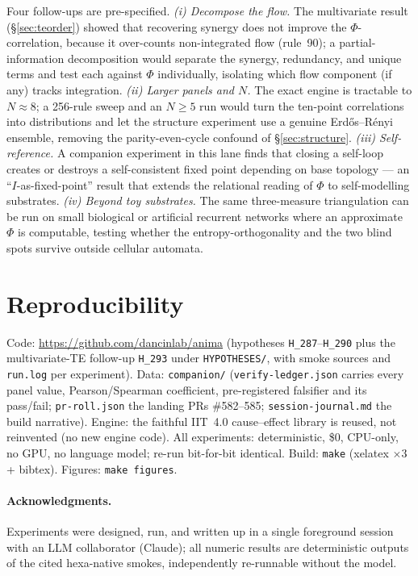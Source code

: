 \documentclass[11pt,a4paper]{article}
\newcommand{\bigphi}{\ensuremath{\Phi}}
\begin{document}
Four follow-ups are pre-specified. \emph{(i) Decompose the flow.} The
multivariate result (\S\ref{sec:teorder}) showed that recovering synergy
does not improve the \bigphi{}-correlation, because it over-counts
non-integrated flow (rule~90); a partial-information decomposition would
separate the synergy, redundancy, and unique terms and test each against
\bigphi{} individually, isolating which flow component (if any) tracks
integration. \emph{(ii) Larger panels and \(N\).} The exact engine is tractable
to \(N\!\approx\!8\); a 256-rule sweep and an \(N\ge5\) run would turn the
ten-point correlations into distributions and let the structure
experiment use a genuine Erd\H{o}s--R\'enyi ensemble, removing the
parity-even-cycle confound of \S\ref{sec:structure}. \emph{(iii)
Self-reference.} A companion experiment in this lane finds that closing a
self-loop creates or destroys a self-consistent fixed point depending on
base topology --- an ``\(I\)-as-fixed-point'' result that extends the
relational reading of \bigphi{} to self-modelling substrates. \emph{(iv)
Beyond toy substrates.} The same three-measure triangulation can be run on
small biological or artificial recurrent networks where an approximate
\bigphi{} is computable, testing whether the entropy-orthogonality and the
two blind spots survive outside cellular automata.

\section{Reproducibility}
\label{sec:repro}

Code: \url{https://github.com/dancinlab/anima} (hypotheses
\texttt{H\_287}--\texttt{H\_290} plus the multivariate-TE follow-up
\texttt{H\_293} under \texttt{HYPOTHESES/}, with smoke sources and
\texttt{run.log} per experiment). Data: \texttt{companion/}
(\texttt{verify-ledger.json} carries every panel value, Pearson/Spearman
coefficient, pre-registered falsifier and its pass/fail;
\texttt{pr-roll.json} the landing PRs \#582--585;
\texttt{session-journal.md} the build narrative). Engine: the faithful
IIT~4.0 cause--effect library is reused, not reinvented (no new engine
code). All experiments: deterministic, \$0, CPU-only, no GPU, no language
model; re-run bit-for-bit identical. Build: \texttt{make} (xelatex
\(\times 3\) + bibtex). Figures: \texttt{make figures}.

\paragraph{Acknowledgments.}
Experiments were designed, run, and written up in a single foreground
session with an LLM collaborator (Claude); all numeric results are
deterministic outputs of the cited hexa-native smokes, independently
re-runnable without the model.
\end{document}
